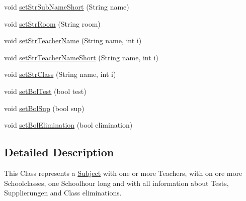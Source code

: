 \begin{DoxyCompactItemize}
\item 
void \hyperlink{class_app_test_solution_1_1other_classes_1_1_subject_a7bf200d3a1313fe47ed069c961c108dc}{set\-Str\-Sub\-Name\-Short} (String name)
\item 
void \hyperlink{class_app_test_solution_1_1other_classes_1_1_subject_add77a4a8e85c65dc54afa8becd6d0e03}{set\-Str\-Room} (String room)
\item 
void \hyperlink{class_app_test_solution_1_1other_classes_1_1_subject_a505684b185e40af85e4b48f863f4a798}{set\-Str\-Teacher\-Name} (String name, int i)
\item 
void \hyperlink{class_app_test_solution_1_1other_classes_1_1_subject_a48d2a82db9e4f2726e5aefdca7de9957}{set\-Str\-Teacher\-Name\-Short} (String name, int i)
\item 
void \hyperlink{class_app_test_solution_1_1other_classes_1_1_subject_a5738a2fa200ba6ed0eca71b3117413db}{set\-Str\-Class} (String name, int i)
\item 
void \hyperlink{class_app_test_solution_1_1other_classes_1_1_subject_a291ed09c41cfa8945d8d387f3ac55c26}{set\-Bol\-Test} (bool test)
\item 
void \hyperlink{class_app_test_solution_1_1other_classes_1_1_subject_a56bb3f053c2a7d0df239ce768df1bc8b}{set\-Bol\-Sup} (bool sup)
\item 
void \hyperlink{class_app_test_solution_1_1other_classes_1_1_subject_a879a1c3d9dd48224238bd80b3ea1960b}{set\-Bol\-Elimination} (bool elimination)
\end{DoxyCompactItemize}


\subsection{Detailed Description}
This Class represents a \hyperlink{class_app_test_solution_1_1other_classes_1_1_subject}{Subject} with one or more Teachers, with on ore more Schoolclasses, one Schoolhour long and with all information about Tests, Supplierungen and Class eliminations. 



